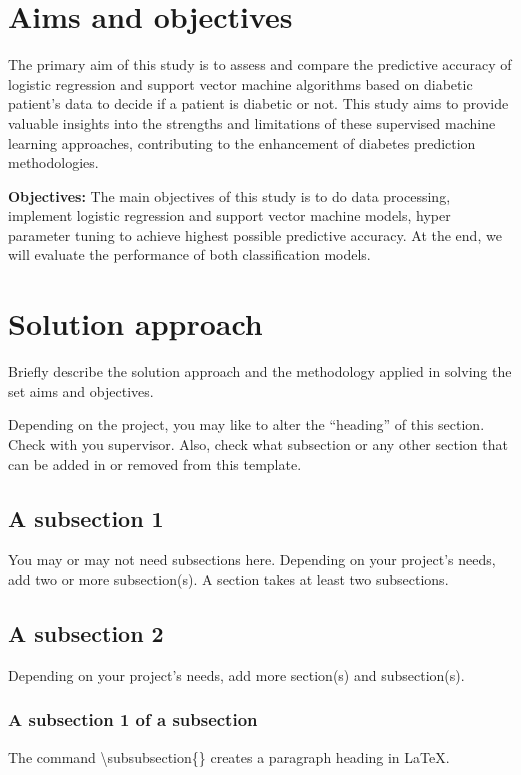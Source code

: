 \section{Aims and objectives}
\label{sec:intro_aims_obj}

The primary aim of this study is to assess and compare the predictive accuracy of logistic regression and support vector machine algorithms based on diabetic patient's data to decide if a patient is diabetic or not. This study aims to provide valuable insights into the strengths and limitations of these supervised machine learning approaches, contributing to the enhancement of diabetes prediction methodologies.

\textbf{Objectives:} 
The main objectives of this study is to do data processing, implement logistic regression and support vector machine models, hyper parameter tuning to achieve highest possible predictive accuracy. At the end, we will evaluate the performance of both classification models.

\section{Solution approach}
\label{sec:intro_sol} %
Briefly describe the solution approach and the methodology applied in solving the set aims and objectives.

Depending on the project, you may like to alter the ``heading'' of this section. Check with you supervisor. Also, check what subsection or any other section that can be added in or removed from this template.

\subsection{A subsection 1}
\label{sec:intro_some_sub1}
You may or may not need subsections here. Depending on your project's needs, add two or more subsection(s). A section takes at least two subsections. 

\subsection{A subsection 2}
\label{sec:intro_some_sub2}
Depending on your project's needs, add more section(s) and subsection(s).

\subsubsection{A subsection 1 of a subsection}
\label{sec:intro_some_subsub1}
The command \textbackslash subsubsection\{\} creates a paragraph heading in \LaTeX.

